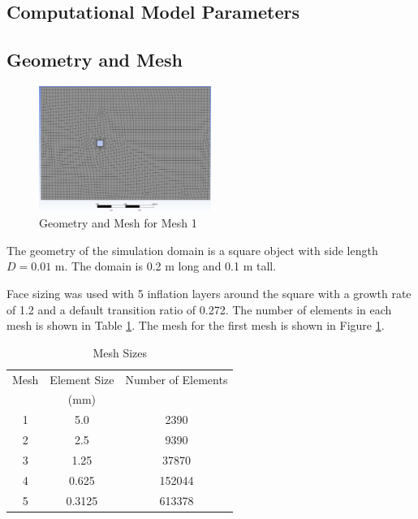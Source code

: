 \subsection{Computational Model Parameters}
\subsection{Geometry and Mesh}
\begin{figure}[H]
    \centering
    \includegraphics[width=0.5\textwidth]{Questions/Figures/grid 1 mesh.png}
    \caption{Geometry and Mesh for Mesh 1}
    \label{fig:mesh1}
\end{figure}
The geometry of the simulation domain is a square object with side length $D = 0.01$ m. The domain is 0.2 m long and 0.1 m tall. 

Face sizing was used with 5 inflation layers around the square with a growth rate of 1.2 and a default transition ratio of 0.272. The number of elements in each mesh is shown in Table \ref{tab:mesh_sizes}. The mesh for the first mesh is shown in Figure \ref{fig:mesh1}. 
\begin{table}[H]
    \centering
    \caption{Mesh Sizes}
    \label{tab:mesh_sizes}
    \begin{tabular}{ccc}
        \toprule
        Mesh & Element Size & Number of Elements \\
        & (mm) & \\
        \midrule
        1 & 5.0 & 2390 \\
        2 & 2.5 & 9390 \\
        3 & 1.25 & 37870 \\
        4 & 0.625 & 152044 \\
        5 & 0.3125 & 613378 \\
        \bottomrule
    \end{tabular}
\end{table}

